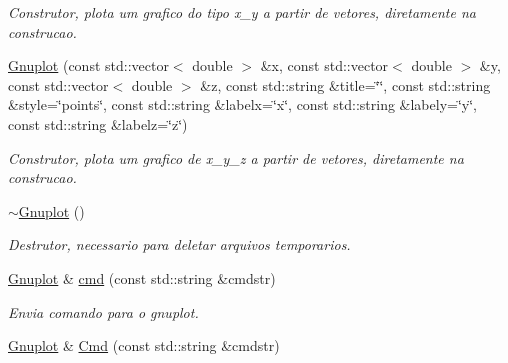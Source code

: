 \begin{DoxyCompactItemize}
\begin{DoxyCompactList}\small\item\em Construtor, plota um grafico do tipo x\-\_\-y a partir de vetores, diretamente na construcao. \end{DoxyCompactList}\item 
\hypertarget{classGnuplot_a14191e89154f2716608f6907975cc012}{\hyperlink{classGnuplot_a14191e89154f2716608f6907975cc012}{Gnuplot} (const std\-::vector$<$ double $>$ \&x, const std\-::vector$<$ double $>$ \&y, const std\-::vector$<$ double $>$ \&z, const std\-::string \&title=\char`\"{}\char`\"{}, const std\-::string \&style=\char`\"{}points\char`\"{}, const std\-::string \&labelx=\char`\"{}x\char`\"{}, const std\-::string \&labely=\char`\"{}y\char`\"{}, const std\-::string \&labelz=\char`\"{}z\char`\"{})}\label{classGnuplot_a14191e89154f2716608f6907975cc012}

\begin{DoxyCompactList}\small\item\em Construtor, plota um grafico de x\-\_\-y\-\_\-z a partir de vetores, diretamente na construcao. \end{DoxyCompactList}\item 
\hypertarget{classGnuplot_a78a68f621caa87d1f34324fcd093c7bd}{\hyperlink{classGnuplot_a78a68f621caa87d1f34324fcd093c7bd}{$\sim$\-Gnuplot} ()}\label{classGnuplot_a78a68f621caa87d1f34324fcd093c7bd}

\begin{DoxyCompactList}\small\item\em Destrutor, necessario para deletar arquivos temporarios. \end{DoxyCompactList}\item 
\hypertarget{classGnuplot_a07607803ede8dd5416906df0a1924fc5}{\hyperlink{classGnuplot}{Gnuplot} \& \hyperlink{classGnuplot_a07607803ede8dd5416906df0a1924fc5}{cmd} (const std\-::string \&cmdstr)}\label{classGnuplot_a07607803ede8dd5416906df0a1924fc5}

\begin{DoxyCompactList}\small\item\em Envia comando para o gnuplot. \end{DoxyCompactList}\item 
\hypertarget{classGnuplot_af9ffb5b4c18cdf7c56e5c446f72e515d}{\hyperlink{classGnuplot}{Gnuplot} \& \hyperlink{classGnuplot_af9ffb5b4c18cdf7c56e5c446f72e515d}{Cmd} (const std\-::string \&cmdstr)}\label{classGnuplot_af9ffb5b4c18cdf7c56e5c446f72e515d}


\end{DoxyCompactItemize}
